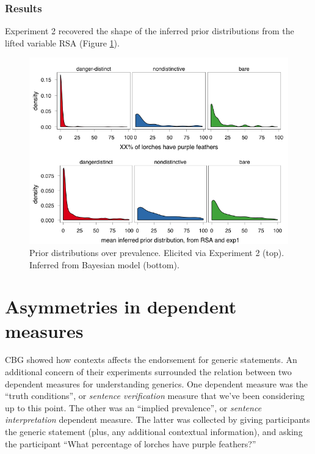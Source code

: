 \documentclass[10pt,letterpaper]{article}
\begin{document}
\subsubsection{Results}

Experiment 2 recovered the shape of the inferred prior distributions from the lifted variable RSA (Figure \ref{fig:modeldatapriors}).


\begin{figure}
\centering
    \includegraphics[width=\columnwidth]{exp2densities_inferredMeanPriorExp1}
    \caption{Prior distributions over prevalence. Elicited via Experiment 2 (top). Inferred from Bayesian model (bottom).}
  \label{fig:modeldatapriors}
\end{figure}


\section{Asymmetries in dependent measures}

CBG showed how contexts affects the endorsement for generic statements. An additional concern of their experiments surrounded the relation between two dependent measures for understanding generics. One dependent measure was the ``truth conditions'', or \emph{sentence verification} measure that we've been considering up to this point. The other was an ``implied prevalence'', or \emph{sentence interpretation} dependent measure. The latter was collected by giving participants the generic statement (plus, any additional contextual information), and asking the participant ``What percentage of lorches have purple feathers?''
\end{document}
